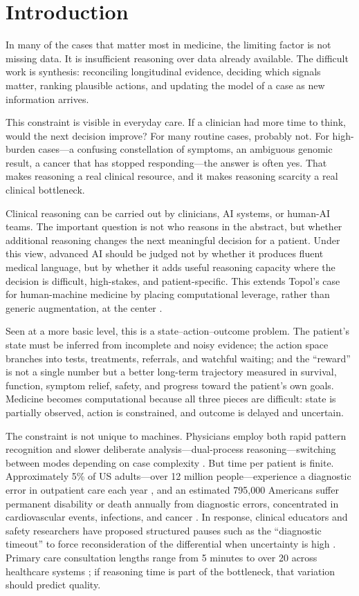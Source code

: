 \documentclass[11pt]{article}
\begin{document}
\section{Introduction}
In many of the cases that matter most in medicine, the limiting factor is not missing data. It is insufficient reasoning over data already available. The difficult work is synthesis: reconciling longitudinal evidence, deciding which signals matter, ranking plausible actions, and updating the model of a case as new information arrives.

This constraint is visible in everyday care. If a clinician had more time to think, would the next decision improve? For many routine cases, probably not. For high-burden cases---a confusing constellation of symptoms, an ambiguous genomic result, a cancer that has stopped responding---the answer is often yes. That makes reasoning a real clinical resource, and it makes reasoning scarcity a real clinical bottleneck.

Clinical reasoning can be carried out by clinicians, AI systems, or human-AI teams. The important question is not who reasons in the abstract, but whether additional reasoning changes the next meaningful decision for a patient. Under this view, advanced AI should be judged not by whether it produces fluent medical language, but by whether it adds useful reasoning capacity where the decision is difficult, high-stakes, and patient-specific. This extends Topol's case for human-machine medicine by placing computational leverage, rather than generic augmentation, at the center \citep{topol2019}.

Seen at a more basic level, this is a state--action--outcome problem. The patient's state must be inferred from incomplete and noisy evidence; the action space branches into tests, treatments, referrals, and watchful waiting; and the ``reward'' is not a single number but a better long-term trajectory measured in survival, function, symptom relief, safety, and progress toward the patient's own goals. Medicine becomes computational because all three pieces are difficult: state is partially observed, action is constrained, and outcome is delayed and uncertain.

The constraint is not unique to machines. Physicians employ both rapid pattern recognition and slower deliberate analysis---dual-process reasoning---switching between modes depending on case complexity \citep{croskerry2009}. But time per patient is finite. Approximately 5\% of US adults---over 12 million people---experience a diagnostic error in outpatient care each year \citep{singh2014}, and an estimated 795,000 Americans suffer permanent disability or death annually from diagnostic errors, concentrated in cardiovascular events, infections, and cancer \citep{newmantoker2024}. In response, clinical educators and safety researchers have proposed structured pauses such as the ``diagnostic timeout'' to force reconsideration of the differential when uncertainty is high \citep{graber2005,croskerry2009}. Primary care consultation lengths range from 5 minutes to over 20 across healthcare systems \citep{irving2017}; if reasoning time is part of the bottleneck, that variation should predict quality.
\end{document}
